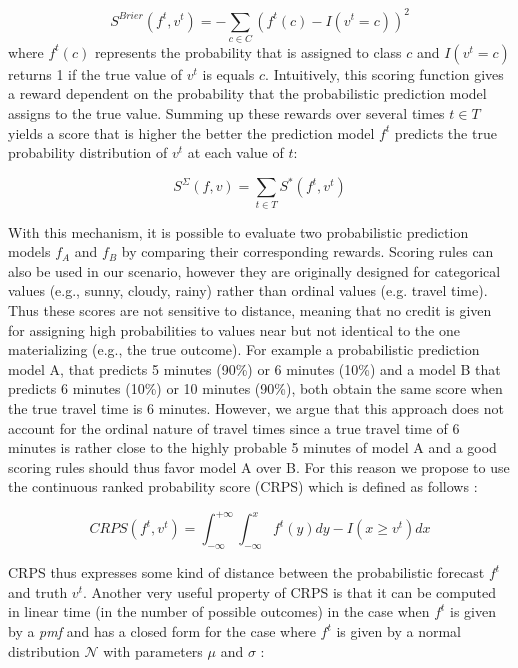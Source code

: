 $$
	S^{Brier}(f^t, v^t) = -\sum_{c \in C} (f^t(c) - I(v^t = c))^2
$$
where $f^t(c)$ represents the probability that is assigned to class $c$ and
$I(v^t = c)$ returns 1 if the true value of $v^t$ is equals $c$.
Intuitively, this scoring function gives a reward dependent on the
probability that the probabilistic prediction model assigns to the true value.
Summing up these rewards over several times $t \in T$ yields a score that is
higher the better the prediction model $f^t$ predicts the true probability
distribution of $v^t$ at each value of $t$:

\vspace{0.1cm}

$$
	S^\Sigma (f, v) = \sum_{t \in T} S^*(f^t, v^t)
$$

\vspace{0.1cm}

With this mechanism, it is possible to evaluate two probabilistic prediction
models $f_A$ and $f_B$ by comparing their corresponding rewards.
Scoring rules can also be used in our scenario, however they are originally
designed for categorical values (e.g., sunny, cloudy, rainy) rather than ordinal
values (e.g. travel time). Thus these scores are not sensitive to distance,
meaning that no credit is given for assigning high probabilities to values near
but not identical to the one materializing (e.g., the true outcome). For example
a probabilistic prediction model A, that predicts 5 minutes (90\%) or 6
minutes (10\%) and a model B that predicts 6 minutes (10\%) or 10 minutes
(90\%), both obtain the same score when the true travel time is 6 minutes. However, we argue that this approach
does not account for the ordinal nature of travel times since a true travel time
of 6 minutes is rather close to the highly probable 5 minutes of model A and a
good scoring rules should thus favor model A over B. For this reason we propose
to use the continuous ranked probability score (CRPS) which is defined as
follows \cite{Her00}:

\vspace{0.1cm}

\begin{equation}
CRPS(f^t, v^t) = \int_{-\infty}^{+\infty} \int_{-\infty}^{x} f^t(y) dy - I(x
\geq v^t) dx
\end{equation}

\vspace{0.1cm}

CRPS thus expresses some kind of distance between the probabilistic forecast
$f^t$ and truth $v^t$. Another very useful property of CRPS is that it can be computed in
linear time (in the number of possible outcomes) in the case when $f^t$ is given
by a \textit{pmf} and has a closed form for the case where $f^t$ is given by a
normal distribution $\mathcal{N}$ with parameters $\mu$ and $\sigma$ \cite{GneRaf07}:

